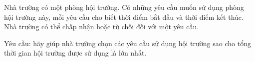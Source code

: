 Nhà trường có một phòng hội trường. Có những yêu cầu muốn sử dụng phòng hội trường này, mỗi yêu cầu cho biết thời điểm bắt đầu và thời điểm kết thúc. Nhà trường có thể chấp nhận hoặc từ chối đối với một yêu cầu.  

   Yêu cầu: hãy giúp nhà trường chọn các yêu cầu sử dụng hội trường sao cho tổng thời gian hội trường được sử dụng là lớn nhất.